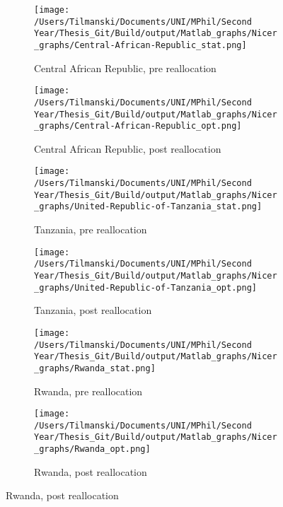 \documentclass[11pt, oneside]{article}   	%
\begin{document}
\begin{figure}[!h]
\centering
\caption{Reallocation Scenario for different countries}

\begin{subfigure}[c]{0.45\textwidth}
\texttt{[image: /Users/Tilmanski/Documents/UNI/MPhil/Second Year/Thesis\_Git/Build/output/Matlab\_graphs/Nicer\_graphs/Central-African-Republic\_stat.png]}
\caption{Central African Republic, pre reallocation}
\label{fig:cae_pre}
\end{subfigure}
\begin{subfigure}[c]{0.45\textwidth}
\texttt{[image: /Users/Tilmanski/Documents/UNI/MPhil/Second Year/Thesis\_Git/Build/output/Matlab\_graphs/Nicer\_graphs/Central-African-Republic\_opt.png]}
\caption{Central African Republic, post reallocation}
\label{fig:cae_post}
\end{subfigure}

\begin{subfigure}[c]{0.45\textwidth}
\texttt{[image: /Users/Tilmanski/Documents/UNI/MPhil/Second Year/Thesis\_Git/Build/output/Matlab\_graphs/Nicer\_graphs/United-Republic-of-Tanzania\_stat.png]}
\caption{Tanzania, pre reallocation}
\label{fig:tanzania_pre}
\end{subfigure}
\begin{subfigure}[c]{0.45\textwidth}
\texttt{[image: /Users/Tilmanski/Documents/UNI/MPhil/Second Year/Thesis\_Git/Build/output/Matlab\_graphs/Nicer\_graphs/United-Republic-of-Tanzania\_opt.png]}
\caption{Tanzania, post reallocation}
\label{fig:tanzania_post}
\end{subfigure}

\begin{subfigure}[c]{0.45\textwidth}
\texttt{[image: /Users/Tilmanski/Documents/UNI/MPhil/Second Year/Thesis\_Git/Build/output/Matlab\_graphs/Nicer\_graphs/Rwanda\_stat.png]}
\caption{Rwanda, pre reallocation}
\label{fig:rwanda_pre}
\end{subfigure}
\begin{subfigure}[c]{0.45\textwidth}
\texttt{[image: /Users/Tilmanski/Documents/UNI/MPhil/Second Year/Thesis\_Git/Build/output/Matlab\_graphs/Nicer\_graphs/Rwanda\_opt.png]}
\caption{Rwanda, post reallocation}
\label{fig:rwanda_post}
\end{subfigure}

\label{fig:Reallocations}
\end{figure}
\end{document}
